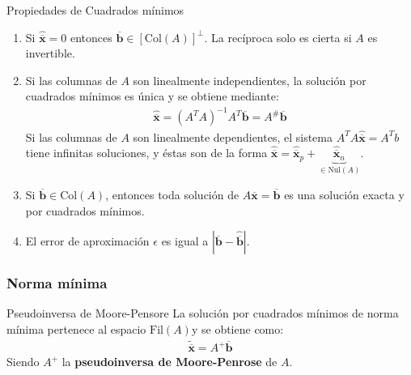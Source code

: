 \documentclass[a4paper, twoside]{article}
\numberwithin{equation}{section}
\numberwithin{figure}{section}
\numberwithin{table}{section}
\newcommand{\vect}[1]{\overline{\textbf{#1}}}
\newcommand{\fil}[1]{\text{Fil}(#1)}
\newcommand{\col}[1]{\text{Col}(#1)}
\newcommand{\nul}[1]{\text{Nul}(#1)}
\newcommand{\dete}[1]{\left\vert #1 \right\vert}
\begin{document}
\begin{corolario*}{Propiedades de Cuadrados mínimos}
	\begin{enumerate}
		\item Si $\hat{\vect{x}}=0$ entonces $\vect{b} \in [\col{A}]^\bot$. La recíproca solo es cierta si $A$ es invertible.
		\item Si las columnas de $A$ son linealmente independientes, la solución por cuadrados mínimos es única y se obtiene mediante:
			\begin{align}
				\hat{\vect{x}}=(A^T A)^{-1}A^T \vect{b}=A^{\#}\vect{b}
			\end{align}
		Si las columnas de $A$ son linealmente dependientes, el sistema $A^T A\hat{\vect{x}}=A^T b$ tiene infinitas soluciones, y éstas son de la forma $\hat{\vect{x}}=\hat{\vect{x}}_p+\underbrace{\hat{\vect{x}}_n}_{\in \nul{A}}$.
		\item Si $\vect{b} \in \col{A}$, entonces toda solución de $A\vect{x}=\vect{b}$ es una solución exacta y por cuadrados mínimos.
		\item El error de aproximación $\epsilon$ es igual a $\dete{\vect{b}-\hat{\vect{b}}}$.
			\end{enumerate}
\end{corolario*}

\subsubsection{Norma mínima}
\begin{corolario*}{Pseudoinversa de Moore-Pensore}
	La solución por cuadrados mínimos de norma mínima pertenece al espacio $\fil{A}$y se obtiene como:
	\begin{align}
		\tilde{\vect{x}}=A^+ \vect{b}
	\end{align}
	Siendo $A^+$ la \textbf{pseudoinversa de Moore-Penrose} de $A$.
\end{corolario*}
\end{document}
